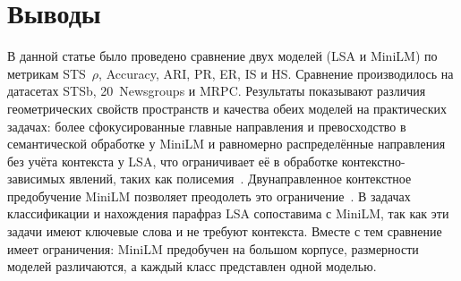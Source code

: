 \section{Выводы}

В данной статье было проведено сравнение двух моделей (LSA и MiniLM)
по метрикам STS~$\rho$, Accuracy, ARI, PR, ER, IS и HS.
Сравнение производилось на датасетах STSb, 20~Newsgroups и MRPC.
Результаты показывают различия геометрических свойств пространств
и качества обеих моделей на практических задачах: более
сфокусированные главные направления и превосходство в семантической
обработке у MiniLM и равномерно распределённые направления без учёта
контекста у LSA, что ограничивает её в обработке контекстно-зависимых
явлений, таких как полисемия~\cite{hofmann1999plsa}.
Двунаправленное контекстное предобучение MiniLM позволяет преодолеть
это ограничение~\cite{artetxe2022bidirectionality}.
В задачах классификации и нахождения парафраз LSA
сопоставима с MiniLM, так как эти задачи имеют ключевые слова и не
требуют контекста. Вместе с тем сравнение имеет ограничения: MiniLM
предобучен на большом корпусе, размерности моделей различаются, а
каждый класс представлен одной моделью.
